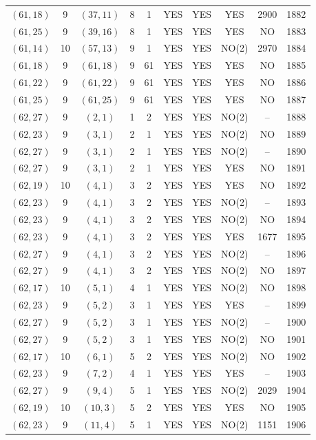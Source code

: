 \begin{longtable}{|c|c|c|c|c|c|c|c|c|c|}
$(61, 18)$ & 9 & $(37, 11)$ & 8 & 1 & YES & YES & YES & 2900 & 1882\\
$(61, 25)$ & 9 & $(39, 16)$ & 8 & 1 & YES & YES & YES & NO & 1883\\
$(61, 14)$ & 10 & $(57, 13)$ & 9 & 1 & YES & YES & NO(2) & 2970 & 1884\\
$(61, 18)$ & 9 & $(61, 18)$ & 9 & 61 & YES & YES & YES & NO & 1885\\
$(61, 22)$ & 9 & $(61, 22)$ & 9 & 61 & YES & YES & YES & NO & 1886\\
$(61, 25)$ & 9 & $(61, 25)$ & 9 & 61 & YES & YES & YES & NO & 1887\\
$(62, 27)$ & 9 & $(2, 1)$ & 1 & 2 & YES & YES & NO(2) & -- & 1888\\
$(62, 23)$ & 9 & $(3, 1)$ & 2 & 1 & YES & YES & NO(2) & NO & 1889\\
$(62, 27)$ & 9 & $(3, 1)$ & 2 & 1 & YES & YES & NO(2) & -- & 1890\\
$(62, 27)$ & 9 & $(3, 1)$ & 2 & 1 & YES & YES & YES & NO & 1891\\
$(62, 19)$ & 10 & $(4, 1)$ & 3 & 2 & YES & YES & YES & NO & 1892\\
$(62, 23)$ & 9 & $(4, 1)$ & 3 & 2 & YES & YES & NO(2) & -- & 1893\\
$(62, 23)$ & 9 & $(4, 1)$ & 3 & 2 & YES & YES & NO(2) & NO & 1894\\
$(62, 23)$ & 9 & $(4, 1)$ & 3 & 2 & YES & YES & YES & 1677 & 1895\\
$(62, 27)$ & 9 & $(4, 1)$ & 3 & 2 & YES & YES & NO(2) & -- & 1896\\
$(62, 27)$ & 9 & $(4, 1)$ & 3 & 2 & YES & YES & NO(2) & NO & 1897\\
$(62, 17)$ & 10 & $(5, 1)$ & 4 & 1 & YES & YES & NO(2) & NO & 1898\\
$(62, 23)$ & 9 & $(5, 2)$ & 3 & 1 & YES & YES & YES & -- & 1899\\
$(62, 27)$ & 9 & $(5, 2)$ & 3 & 1 & YES & YES & NO(2) & -- & 1900\\
$(62, 27)$ & 9 & $(5, 2)$ & 3 & 1 & YES & YES & NO(2) & NO & 1901\\
$(62, 17)$ & 10 & $(6, 1)$ & 5 & 2 & YES & YES & NO(2) & NO & 1902\\
$(62, 23)$ & 9 & $(7, 2)$ & 4 & 1 & YES & YES & YES & -- & 1903\\
$(62, 27)$ & 9 & $(9, 4)$ & 5 & 1 & YES & YES & NO(2) & 2029 & 1904\\
$(62, 19)$ & 10 & $(10, 3)$ & 5 & 2 & YES & YES & YES & NO & 1905\\
$(62, 23)$ & 9 & $(11, 4)$ & 5 & 1 & YES & YES & NO(2) & 1151 & 1906\\

\end{longtable}
